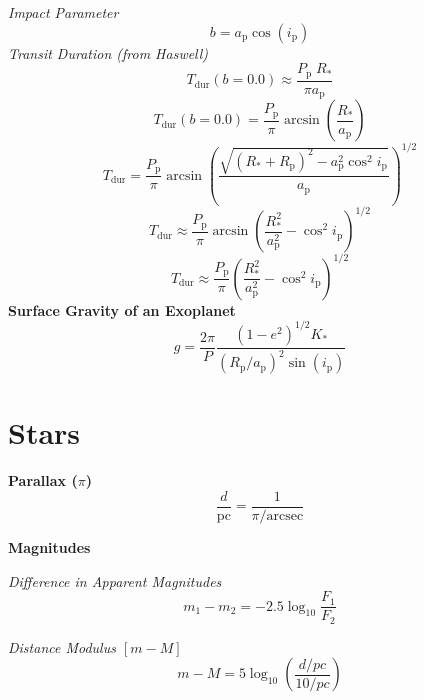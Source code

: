 \documentclass{article}
\begin{document}
\textit{Impact Parameter}
\begin{equation}
b = a_\mathrm{p} \cos(i_\mathrm{p})
\end{equation}
\textit{Transit Duration (from Haswell)}
\begin{equation}
T_\mathrm{dur}(b = 0.0) \approx \frac{P_\mathrm{p} \; R_\mathrm{*}}{\pi a_\mathrm{p}}
\end{equation}
\begin{equation}
T_\mathrm{dur}(b = 0.0) =  \frac{P_\mathrm{p}}{\pi} \arcsin \left( \frac{R_\mathrm{*}}{a_\mathrm{p}} \right)
\end{equation}
\begin{equation}
T_\mathrm{dur} =  \frac{P_\mathrm{p}}{\pi} \arcsin \left( \frac{\sqrt{(R_\mathrm{*}+R_\mathrm{p})^2 - a_\mathrm{p}^2 \cos^2 i_\mathrm{p}}}{a_\mathrm{p}} \right)^{1/2}
\end{equation}
\begin{equation}
T_\mathrm{dur} \approx  \frac{P_\mathrm{p}}{\pi} \arcsin \left( \frac{R_\mathrm{*}^2}{a_\mathrm{p}^2} - \cos^2 i_\mathrm{p} \right)^{1/2}
\end{equation}
\begin{equation}
T_\mathrm{dur} \approx  \frac{P_\mathrm{p}}{\pi} \left( \frac{R_\mathrm{*}^2}{a_\mathrm{p}^2} - \cos^2 i_\mathrm{p} \right)^{1/2}
\end{equation}
\textbf {Surface Gravity of an Exoplanet}
\begin{equation}
g = \frac{2 \pi}{P} \frac{(1-e^2)^{1/2} K_\mathrm{*}}{(R_\mathrm{p}/a_\mathrm{p})^2 \sin(i_\mathrm{p})}
\end{equation}
\newpage

\section {Stars}
\textbf {Parallax (\(\pi\))}
\begin{equation}
\frac{d}{\mathrm{pc}} = \frac{1}{\pi / \mathrm{arcsec}}
\end{equation}


\textbf {Magnitudes}

\textit {Difference in Apparent Magnitudes}
\begin{equation}
m_\mathrm{1} - m_\mathrm{2} = -2.5 \log _{10} \frac {F_\mathrm{1}}{F_\mathrm{2}}
\end{equation}

\textit {Distance Modulus \(\left[ m - M \right]\)}
\begin{equation}
m - M = 5 \log _\mathrm{10} \left( \frac {d / pc} {10 / pc} \right)
\end{equation}
\end{document}
